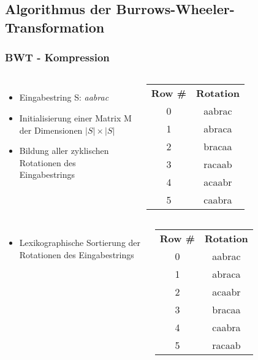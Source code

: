 \documentclass[14pt,xcolor=dvipsnames]{beamer}
\begin{document}
\subsection{Algorithmus der Burrows-Wheeler-Transformation}
\begin{frame}[allowframebreaks]
 \frametitle{BWT - Kompression}
    \begin{columns}[c,onlytextwidth]
    \begin{itemize}
	\item Eingabestring S: \textit{aabrac}
	\item Initialisierung einer Matrix M der Dimensionen $|S| \times |S|$
	\item Bildung aller zyklischen Rotationen des Eingabestrings
    \end{itemize}
    \begin{tabular}{c|c}
    \textbf{Row \#} & \textbf{Rotation} \\
    0 & aabrac \\
    1 & abraca \\
    2 & bracaa \\
    3 & racaab \\
    4 & acaabr \\
    5 & caabra \\
    \end{tabular}
    \end{columns}
\framebreak
\begin{columns}[c,onlytextwidth]
 \begin{itemize}
  \item Lexikographische Sortierung der Rotationen des Eingabestrings
 \end{itemize}
    \begin{tabular}{c|c}
    \textbf{Row \#} & \textbf{Rotation} \\
    0 & aabrac \\
    1 & abraca \\
    2 & acaabr \\
    3 & bracaa \\
    4 & caabra \\
    5 & racaab \\
    \end{tabular}
\end{columns}
\framebreak
\begin{columns}[c,onlytextwidth]

\end{columns}
\end{frame}
\end{document}
